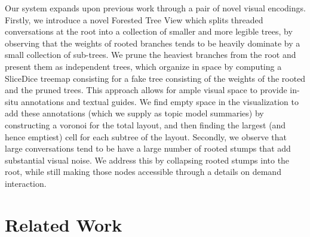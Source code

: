 \documentclass{egpubl}
\begin{document}
Our system expands upon previous work through a pair of novel visual encodings.
%
Firstly, we introduce a novel Forested Tree View which splits threaded conversations at the root into a collection of smaller and more legible trees, by observing that the weights of rooted branches tends to be heavily dominate by a small collection of sub-trees.
%
We prune the heaviest branches from the root and present them as independent trees, which organize in space by computing a SliceDice treemap consisting for a fake tree consisting of the weights of the rooted and the pruned trees.
%
This approach allows for ample visual space to provide in-situ annotations and textual guides. 
%
We find empty space in the visualization to add these annotations (which we supply as topic model summaries) by constructing a voronoi for the total layout, and then finding the largest (and hence emptiest) cell for each subtree of the layout.
%
Secondly, we observe that large conversations tend to be have a large number of rooted stumps that add substantial visual noise.
%
We address this by collapsing rooted stumps into the root, while still making those nodes accessible through a details on demand interaction.





%






 
 \section{Related Work}
 
\end{document}
